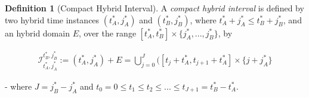 \documentclass{article}
\theoremstyle{definition}
\newtheorem{definition}{Definition}[section]
\begin{document}
\begin{definition}[Compact Hybrid Interval] A \textit{compact hybrid
    interval} is defined by two hybrid time instances $(t^*_A,j^*_A)$ and
    $(t^*_B,j^*_B)$, where $t^*_A + j^*_A \leq t^*_B + j^*_B$, and an hybrid domain $E$, over the range $[t^*_A,
    t^*_B]\times\{j^*_A,..., j^*_B\}$, by

\begin{gather}
    \mathcal{I}^{t_B^*,j_B^*}_{t_A^*,j_A^*}:= (t^*_A,j^*_A) + E = \bigcup\limits_{j=0}^{J} ([t_j + t^*_A,t_{j+1} + t^*_A] \times \{j + j^*_A\}
\end{gather}

- where $J = j^*_B - j^*_A$ and $t_0 = 0 \leq t_1 \leq t_2 \leq ... \leq t_{J+1} =
t^*_B - t^*_A$.
\end{definition}
\end{document}
